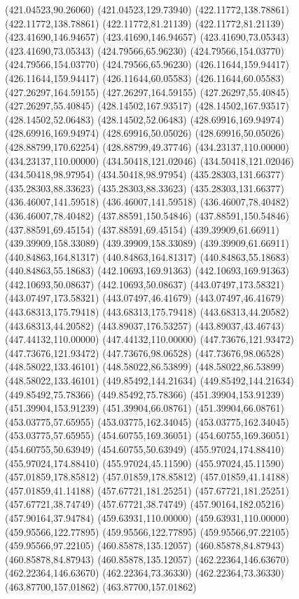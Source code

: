 {(421.04523,90.26060) (421.04523,129.73940) (422.11772,138.78861) (422.11772,138.78861) (422.11772,81.21139) (422.11772,81.21139) (423.41690,146.94657) (423.41690,146.94657)
(423.41690,73.05343) (423.41690,73.05343) (424.79566,65.96230) (424.79566,154.03770) (424.79566,154.03770) (424.79566,65.96230) (426.11644,159.94417) (426.11644,159.94417)
(426.11644,60.05583) (426.11644,60.05583) (427.26297,164.59155) (427.26297,164.59155) (427.26297,55.40845) (427.26297,55.40845) (428.14502,167.93517) (428.14502,167.93517)
(428.14502,52.06483) (428.14502,52.06483) (428.69916,169.94974) (428.69916,169.94974) (428.69916,50.05026) (428.69916,50.05026) (428.88799,170.62254) (428.88799,49.37746)
(434.23137,110.00000) (434.23137,110.00000) (434.50418,121.02046) (434.50418,121.02046) (434.50418,98.97954) (434.50418,98.97954) (435.28303,131.66377) (435.28303,88.33623)
(435.28303,88.33623) (435.28303,131.66377) (436.46007,141.59518) (436.46007,141.59518) (436.46007,78.40482) (436.46007,78.40482) (437.88591,150.54846) (437.88591,150.54846)
(437.88591,69.45154) (437.88591,69.45154) (439.39909,61.66911) (439.39909,158.33089) (439.39909,158.33089) (439.39909,61.66911) (440.84863,164.81317) (440.84863,164.81317)
(440.84863,55.18683) (440.84863,55.18683) (442.10693,169.91363) (442.10693,169.91363) (442.10693,50.08637) (442.10693,50.08637) (443.07497,173.58321) (443.07497,173.58321)
(443.07497,46.41679) (443.07497,46.41679) (443.68313,175.79418) (443.68313,175.79418) (443.68313,44.20582) (443.68313,44.20582) (443.89037,176.53257) (443.89037,43.46743)
(447.44132,110.00000) (447.44132,110.00000) (447.73676,121.93472) (447.73676,121.93472) (447.73676,98.06528) (447.73676,98.06528) (448.58022,133.46101) (448.58022,86.53899)
(448.58022,86.53899) (448.58022,133.46101) (449.85492,144.21634) (449.85492,144.21634) (449.85492,75.78366) (449.85492,75.78366) (451.39904,153.91239) (451.39904,153.91239)
(451.39904,66.08761) (451.39904,66.08761) (453.03775,57.65955) (453.03775,162.34045) (453.03775,162.34045) (453.03775,57.65955) (454.60755,169.36051) (454.60755,169.36051)
(454.60755,50.63949) (454.60755,50.63949) (455.97024,174.88410) (455.97024,174.88410) (455.97024,45.11590) (455.97024,45.11590) (457.01859,178.85812) (457.01859,178.85812)
(457.01859,41.14188) (457.01859,41.14188) (457.67721,181.25251) (457.67721,181.25251) (457.67721,38.74749) (457.67721,38.74749) (457.90164,182.05216) (457.90164,37.94784)
(459.63931,110.00000) (459.63931,110.00000) (459.95566,122.77895) (459.95566,122.77895) (459.95566,97.22105) (459.95566,97.22105) (460.85878,135.12057) (460.85878,84.87943)
(460.85878,84.87943) (460.85878,135.12057) (462.22364,146.63670) (462.22364,146.63670) (462.22364,73.36330) (462.22364,73.36330) (463.87700,157.01862) (463.87700,157.01862)
}

